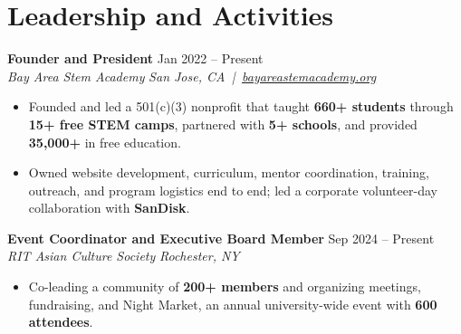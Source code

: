 \documentclass[10pt,letterpaper]{article}
\newif\ifresumeFirstRole
\newcommand{\resumeRole}[4]{%
  \ifresumeFirstRole
    \global\resumeFirstRolefalse
  \else
    \vspace{0pt plus 1fill}%
  \fi
  \textbf{#1} \hfill #2\\
  \textit{#3} \hfill \textit{#4}
}
\begin{document}
\section*{Leadership and Activities}
\resumeRole{Founder and President}{Jan 2022 -- Present}{Bay Area Stem Academy}{San Jose, CA \,|\, \href{https://bayareastemacademy.org}{bayareastemacademy.org}}
\begin{itemize}
  \item Founded and led a 501(c)(3) nonprofit that taught \textbf{660+ students} through \textbf{15+ free STEM camps}, partnered with \textbf{5+ schools}, and provided \textbf{\textdollar{}35,000+} in free education.
  \item Owned website development, curriculum, mentor coordination, training, outreach, and program logistics end to end; led a corporate volunteer-day collaboration with \textbf{SanDisk}.
\end{itemize}

\resumeRole{Event Coordinator and Executive Board Member}{Sep 2024 -- Present}{RIT Asian Culture Society}{Rochester, NY}
\begin{itemize}
  \item Co-leading a community of \textbf{200+ members} and organizing meetings, fundraising, and Night Market, an annual university-wide event with \textbf{600 attendees}.
\end{itemize}
\end{document}
